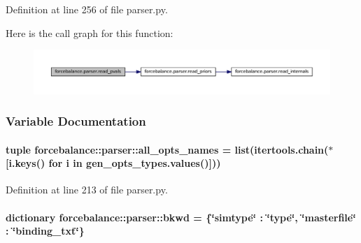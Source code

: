 \-Definition at line 256 of file parser.\-py.



\-Here is the call graph for this function\-:\nopagebreak
\begin{figure}[H]
\begin{center}
\leavevmode
\includegraphics[width=350pt]{namespaceforcebalance_1_1parser_a56fb1e139dad24bac29f25a3870765ca_cgraph}
\end{center}
\end{figure}




\subsubsection{\-Variable \-Documentation}
\hypertarget{namespaceforcebalance_1_1parser_ab0f8ac22b808f515531c830439d70bbb}{
\paragraph[{all\-\_\-opts\-\_\-names}]{\setlength{\rightskip}{0pt plus 5cm}tuple {\bf forcebalance\-::parser\-::all\-\_\-opts\-\_\-names} = list(itertools.\-chain($\ast$\mbox{[}i.\-keys() for i in gen\-\_\-opts\-\_\-types.\-values()\mbox{]}))}}\label{namespaceforcebalance_1_1parser_ab0f8ac22b808f515531c830439d70bbb}


\-Definition at line 213 of file parser.\-py.

\hypertarget{namespaceforcebalance_1_1parser_a37193d7ceabbf07a61e65677372b7dab}{
\paragraph[{bkwd}]{\setlength{\rightskip}{0pt plus 5cm}dictionary {\bf forcebalance\-::parser\-::bkwd} = \{\char`\"{}simtype\char`\"{} \-: \char`\"{}type\char`\"{}, \char`\"{}masterfile\char`\"{} \-: \char`\"{}binding\-\_\-txt\char`\"{}\}}}\label{namespaceforcebalance_1_1parser_a37193d7ceabbf07a61e65677372b7dab}


